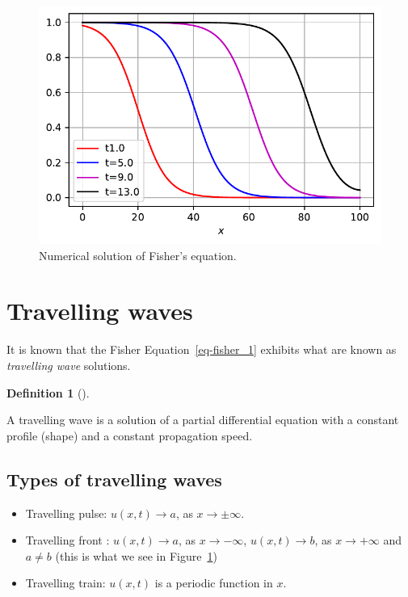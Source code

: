 \documentclass[
  letterpaper,
  DIV=11,
  numbers=noendperiod]{scrreprt}
\providecommand{\tightlist}{%
  \setlength{\itemsep}{0pt}\setlength{\parskip}{0pt}}\usepackage{longtable,booktabs,array}
\theoremstyle{plain}
\theoremstyle{definition}
\newtheorem{definition}{Definition}[chapter]
\theoremstyle{plain}
\theoremstyle{remark}
\begin{document}
\begin{figure}

{\centering \includegraphics{nonlinearreactiondiffusion_files/figure-pdf/fig-logisticpde-output-1.pdf}

}

\caption{\label{fig-logisticpde}Numerical solution of Fisher's
equation.}

\end{figure}

\hypertarget{travelling-waves}{%
\section{Travelling waves}\label{travelling-waves}}

It is known that the Fisher Equation~\ref{eq-fisher_1} exhibits what are
known as \emph{travelling wave} solutions.

\begin{definition}[]\protect\hypertarget{def-trwave}{}\label{def-trwave}

A travelling wave is a solution of a partial differential equation with
a constant profile (shape) and a constant propagation speed.

\end{definition}

\hypertarget{types-of-travelling-waves}{%
\subsection{Types of travelling waves}\label{types-of-travelling-waves}}

\begin{itemize}
\tightlist
\item
  Travelling pulse: \(u(x,t) \to a\), as \(x \to \pm \infty\).
\item
  Travelling front : \(u(x,t) \to a\), as \(x \to - \infty\),
  \(u(x,t) \to b\), as \(x \to + \infty\) and \(a\neq b\) (this is what
  we see in Figure~\ref{fig-logisticpde})
\item
  Travelling train: \(u(x,t)\) is a periodic function in \(x\).
\end{itemize}
\end{document}
